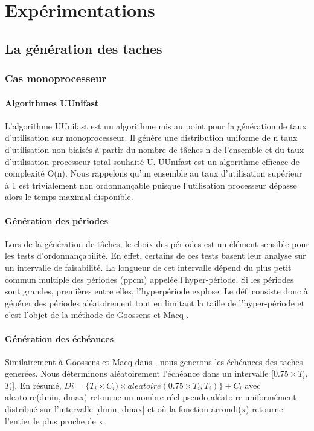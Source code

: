 \chapter{Expérimentations}
\section{La génération des taches}
\subsection{Cas monoprocesseur}
\subsubsection{Algorithmes UUnifast}
L’algorithme UUnifast \cite{} est un algorithme mis au point pour la
génération de taux d’utilisation sur monoprocesseur. Il génère une
distribution uniforme de n taux d’utilisation non biaisés à partir du
nombre de tâches n de l’ensemble et du taux d’utilisation processeur
total souhaité U.  UUnifast est un algorithme efficace de complexité
O(n). Nous rappelons qu’un ensemble au taux d’utilisation supérieur à
1 est trivialement non ordonnançable puisque l’utilisation processeur
dépasse alors le temps maximal disponible.
\subsubsection{Génération des périodes}
Lors de la génération de tâches, le choix des périodes est un élément
sensible pour les tests d’ordonnançabilité. En effet, certains de ces
tests basent leur analyse sur un intervalle de faisabilité.  La
longueur de cet intervalle dépend du plus petit commun multiple des
périodes (ppcm) appelée l’hyper-période. Si les périodes sont grandes,
premières entre elles, l’hyperpériode explose. Le défi consiste donc à
générer des périodes aléatoirement tout en limitant la taille de
l’hyper-période et c’est l’objet de la méthode de Goossens et Macq
\cite{Goossens01}.
\subsubsection{Génération des échéances}
Similairement à Goossens et Macq dans \cite{Goossens01}, nous generons
les échéances des taches generées. Nous déterminons aléatoirement
l’échéance dans un intervalle [$0.75 \times T_i$, $T_i$].  En résumé,
$Di = \lbrace T_i \times C_i) \times aleatoire(0.75 \times T_i,
T_i)\rbrace + C_i$ avec aleatoire(dmin, dmax) retourne un nombre réel
pseudo-aléatoire uniformément distribué sur l’intervalle [dmin, dmax]
et où la fonction arrondi(x) retourne l’entier le plus proche de x.
